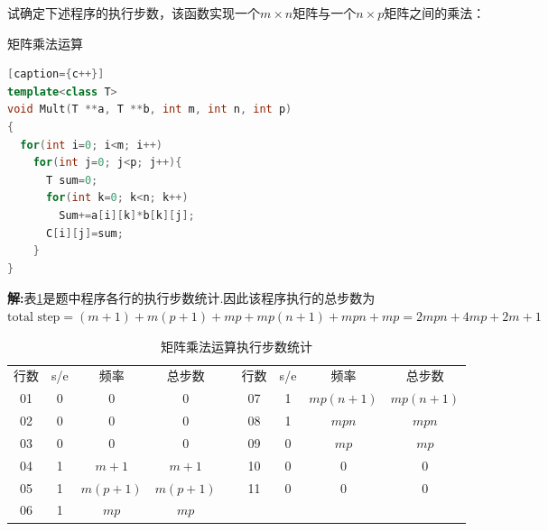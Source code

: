 \begin{problem}[习题1.1]
试确定下述程序的执行步数，该函数实现一个$m\times n$矩阵与一个$n\times p$矩阵之间的乘法：

\centering
矩阵乘法运算
\begin{lstlisting}[language=C++][caption={c++}]
template<class T>
void Mult(T **a, T **b, int m, int n, int p)
{
  for(int i=0; i<m; i++)
    for(int j=0; j<p; j++){
      T sum=0;
      for(int k=0; k<n; k++)
        Sum+=a[i][k]*b[k][j];
      C[i][j]=sum;
    }
}
\end{lstlisting}
\end{problem}

\begin{solution}
\textbf{解:}表\ref{stepcount}是题中程序各行的执行步数统计.因此该程序执行的总步数为$\textrm{total step} = (m+1) +m(p+1)+mp+mp(n+1)+mpn +mp = 2mpn + 4mp+2m + 1$
\begin{table}[!htb]
\centering
\caption{\label{stepcount}矩阵乘法运算执行步数统计}
\begin{tabular}{|l|l|l|l|l|l|l|l|l|}
\cline{1-4}\cline{6-9}
\multicolumn{1}{|c|}{行数} & \multicolumn{1}{c|}{s/e} & \multicolumn{1}{c|}{频率} & \multicolumn{1}{c|}{总步数} & \multicolumn{1}{c|}{} & \multicolumn{1}{c|}{行数} & \multicolumn{1}{c|}{s/e} & \multicolumn{1}{c|}{频率} & \multicolumn{1}{c|}{总步数} \\
\cline{1-4}\cline{6-9}
\multicolumn{1}{|c|}{01} & \multicolumn{1}{c|}{0} & \multicolumn{1}{c|}{0} & \multicolumn{1}{c|}{0} & \multicolumn{1}{c|}{} & \multicolumn{1}{c|}{07} & \multicolumn{1}{c|}{1} & \multicolumn{1}{c|}{$mp(n+1)$} & \multicolumn{1}{c|}{$mp(n+1)$} \\
\multicolumn{1}{|c|}{02} & \multicolumn{1}{c|}{0} & \multicolumn{1}{c|}{0} & \multicolumn{1}{c|}{0} & \multicolumn{1}{c|}{} & \multicolumn{1}{c|}{08} & \multicolumn{1}{c|}{1} & \multicolumn{1}{c|}{$mpn$} & \multicolumn{1}{c|}{$mpn$} \\
\multicolumn{1}{|c|}{03} & \multicolumn{1}{c|}{0} & \multicolumn{1}{c|}{0} & \multicolumn{1}{c|}{0} & \multicolumn{1}{c|}{} & \multicolumn{1}{c|}{09} & \multicolumn{1}{c|}{0} & \multicolumn{1}{c|}{$mp$} & \multicolumn{1}{c|}{$mp$} \\
\multicolumn{1}{|c|}{04} & \multicolumn{1}{c|}{1} & \multicolumn{1}{c|}{$m+1$} & \multicolumn{1}{c|}{$m+1$} & \multicolumn{1}{c|}{} & \multicolumn{1}{c|}{10} & \multicolumn{1}{c|}{0} & \multicolumn{1}{c|}{0} & \multicolumn{1}{c|}{0} \\
\multicolumn{1}{|c|}{05} & \multicolumn{1}{c|}{1} & \multicolumn{1}{c|}{$m(p+1)$} & \multicolumn{1}{c|}{$m(p+1)$} & \multicolumn{1}{c|}{} & \multicolumn{1}{c|}{11} & \multicolumn{1}{c|}{0} & \multicolumn{1}{c|}{0} & \multicolumn{1}{c|}{0} \\
\multicolumn{1}{|c|}{06} & \multicolumn{1}{c|}{1} & \multicolumn{1}{c|}{$mp$} & \multicolumn{1}{c|}{$mp$} & \multicolumn{1}{c|}{} & \multicolumn{1}{c|}{} & \multicolumn{1}{c|}{} & \multicolumn{1}{c|}{} & \multicolumn{1}{c|}{} \\
\cline{1-4}\cline{6-9}
\end{tabular}
\end{table}
\end{solution}
